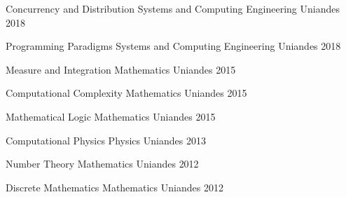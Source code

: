 


\begin{cvhonors}

    \cvhonor
    {Concurrency and Distribution}
    {Systems and Computing Engineering}
    {Uniandes}
    {2018}

    \cvhonor
    {Programming Paradigms}
    {Systems and Computing Engineering}
    {Uniandes}
    {2018}

    \cvhonor
    {Measure and Integration}
    {Mathematics}
    {Uniandes}
    {2015}

    \cvhonor
    {Computational Complexity}
    {Mathematics}
    {Uniandes}
    {2015}

    \cvhonor
    {Mathematical Logic}
    {Mathematics}
    {Uniandes}
    {2015}

    \cvhonor
    {Computational Physics}
    {Physics}
    {Uniandes}
    {2013}

    \cvhonor
    {Number Theory}
    {Mathematics}
    {Uniandes}
    {2012}

    \cvhonor
    {Discrete Mathematics}
    {Mathematics}
    {Uniandes}
    {2012}

\end{cvhonors}
